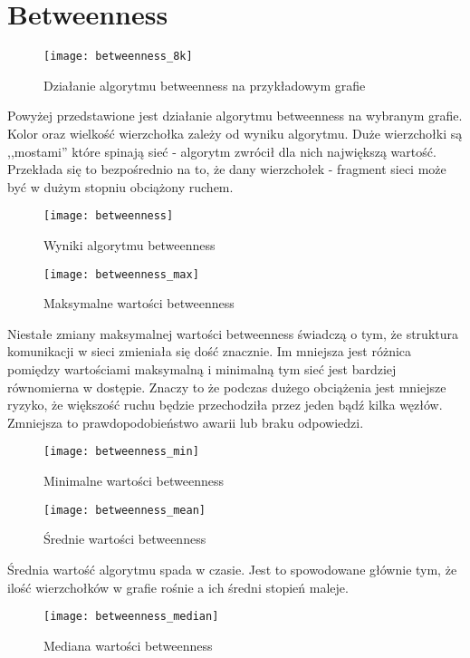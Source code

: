 \section{Betweenness}
\FloatBarrier
\begin{figure}[h]
	\centering
	\texttt{[image: betweenness\_8k]}
	\caption{Działanie algorytmu betweenness na przykładowym grafie}
\end{figure}
\FloatBarrier
Powyżej przedstawione jest działanie algorytmu betweenness na wybranym grafie. Kolor oraz wielkość wierzchołka zależy od wyniku algorytmu. Duże wierzchołki są ,,mostami'' które spinają sieć - algorytm zwrócił dla nich największą wartość. Przekłada się to bezpośrednio na to, że dany wierzchołek - fragment sieci może być w dużym stopniu obciążony ruchem.
\FloatBarrier\FloatBarrier
\begin{figure}[h]
	\centering
	\texttt{[image: betweenness]}
	\caption{Wyniki algorytmu betweenness}
\end{figure}
\FloatBarrier
\begin{figure}[h]
	\centering
	\texttt{[image: betweenness\_max]}
	\caption{Maksymalne wartości betweenness}
\end{figure}
\FloatBarrier
Niestałe zmiany maksymalnej wartości betweenness świadczą o tym, że struktura komunikacji w sieci zmieniała się dość znacznie. Im mniejsza jest różnica pomiędzy wartościami maksymalną i minimalną tym sieć jest bardziej równomierna w dostępie. Znaczy to że podczas dużego obciążenia jest mniejsze ryzyko, że większość ruchu będzie przechodziła przez jeden bądź kilka węzłów. Zmniejsza to prawdopodobieństwo awarii lub braku odpowiedzi.
\FloatBarrier
\begin{figure}[h]
	\centering
	\texttt{[image: betweenness\_min]}
	\caption{Minimalne wartości betweenness}
\end{figure}
\FloatBarrier\FloatBarrier
\begin{figure}[h]
	\centering
	\texttt{[image: betweenness\_mean]}
	\caption{Średnie wartości betweenness}
\end{figure}
\FloatBarrier
Średnia wartość algorytmu spada w czasie. Jest to spowodowane głównie tym, że ilość wierzchołków w grafie rośnie a ich średni stopień maleje.
\FloatBarrier
\begin{figure}[h]
	\centering
	\texttt{[image: betweenness\_median]}
	\caption{Mediana wartości betweenness}
\end{figure}
\FloatBarrier
\newpage